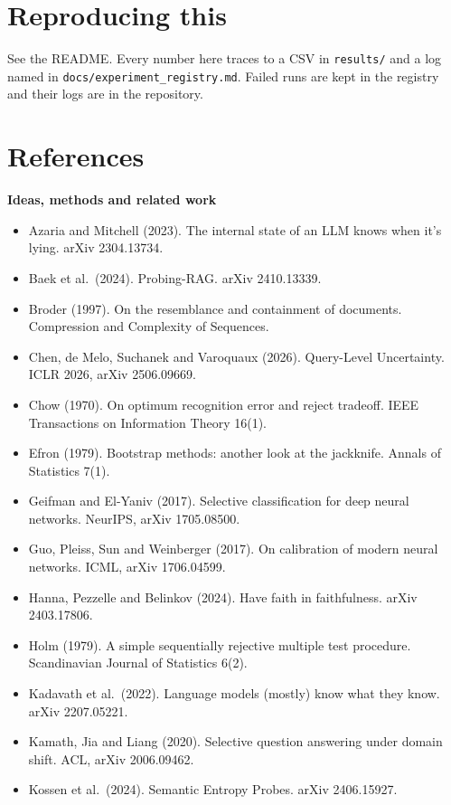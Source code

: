 \documentclass[11pt,a4paper]{article}
\begin{document}
\section{Reproducing this}

See the README. Every number here traces to a CSV in \nolinkurl{results/} and a log named in \nolinkurl{docs/experiment_registry.md}. Failed runs are kept in the registry and their logs are in the repository.

\section*{References}
\small
\textbf{Ideas, methods and related work}
\begin{itemize}\setlength\itemsep{0.15em}
\item Azaria and Mitchell (2023). The internal state of an LLM knows when it's lying. arXiv 2304.13734.
\item Baek et al.\ (2024). Probing-RAG. arXiv 2410.13339.
\item Broder (1997). On the resemblance and containment of documents. Compression and Complexity of Sequences.
\item Chen, de Melo, Suchanek and Varoquaux (2026). Query-Level Uncertainty. ICLR 2026, arXiv 2506.09669.
\item Chow (1970). On optimum recognition error and reject tradeoff. IEEE Transactions on Information Theory 16(1).
\item Efron (1979). Bootstrap methods: another look at the jackknife. Annals of Statistics 7(1).
\item Geifman and El-Yaniv (2017). Selective classification for deep neural networks. NeurIPS, arXiv 1705.08500.
\item Guo, Pleiss, Sun and Weinberger (2017). On calibration of modern neural networks. ICML, arXiv 1706.04599.
\item Hanna, Pezzelle and Belinkov (2024). Have faith in faithfulness. arXiv 2403.17806.
\item Holm (1979). A simple sequentially rejective multiple test procedure. Scandinavian Journal of Statistics 6(2).
\item Kadavath et al.\ (2022). Language models (mostly) know what they know. arXiv 2207.05221.
\item Kamath, Jia and Liang (2020). Selective question answering under domain shift. ACL, arXiv 2006.09462.
\item Kossen et al.\ (2024). Semantic Entropy Probes. arXiv 2406.15927.

\end{itemize}
\end{document}
